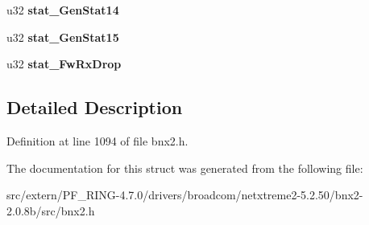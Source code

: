 \begin{DoxyCompactItemize}
\item 
\hypertarget{structstatistics__block_ad3250030f9e5d8f8cf74d99f848698b6}{
u32 {\bfseries stat\_\-GenStat14}}
\label{structstatistics__block_ad3250030f9e5d8f8cf74d99f848698b6}

\item 
\hypertarget{structstatistics__block_a8da8076fdb7070e440fea7c6261931cf}{
u32 {\bfseries stat\_\-GenStat15}}
\label{structstatistics__block_a8da8076fdb7070e440fea7c6261931cf}

\item 
\hypertarget{structstatistics__block_ae32df8dd471379100dd2f3dc1d386ffd}{
u32 {\bfseries stat\_\-FwRxDrop}}
\label{structstatistics__block_ae32df8dd471379100dd2f3dc1d386ffd}

\end{DoxyCompactItemize}


\subsection{Detailed Description}


Definition at line 1094 of file bnx2.h.



The documentation for this struct was generated from the following file:\begin{DoxyCompactItemize}
\item 
src/extern/PF\_\-RING-\/4.7.0/drivers/broadcom/netxtreme2-\/5.2.50/bnx2-\/2.0.8b/src/bnx2.h\end{DoxyCompactItemize}
